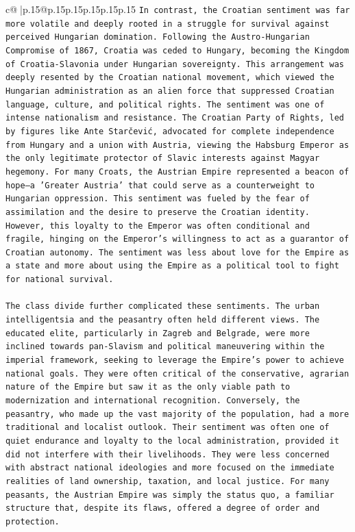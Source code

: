 \documentclass{article}
\begin{document}
{\begin{supertabular}{c@{$\;$}|p{.15\linewidth}@{}p{.15\linewidth}p{.15\linewidth}p{.15\linewidth}p{.15\linewidth}p{.15\linewidth}}
{{{\texttt{In contrast, the Croatian sentiment was far more volatile and deeply rooted in a struggle for survival against perceived Hungarian domination. Following the Austro{-}Hungarian Compromise of 1867, Croatia was ceded to Hungary, becoming the Kingdom of Croatia{-}Slavonia under Hungarian sovereignty. This arrangement was deeply resented by the Croatian national movement, which viewed the Hungarian administration as an alien force that suppressed Croatian language, culture, and political rights. The sentiment was one of intense nationalism and resistance. The Croatian Party of Rights, led by figures like Ante Starčević, advocated for complete independence from Hungary and a union with Austria, viewing the Habsburg Emperor as the only legitimate protector of Slavic interests against Magyar hegemony. For many Croats, the Austrian Empire represented a beacon of hope—a 'Greater Austria' that could serve as a counterweight to Hungarian oppression. This sentiment was fueled by the fear of assimilation and the desire to preserve the Croatian identity. However, this loyalty to the Emperor was often conditional and fragile, hinging on the Emperor's willingness to act as a guarantor of Croatian autonomy. The sentiment was less about love for the Empire as a state and more about using the Empire as a political tool to fight for national survival.} \\
\\ 
\texttt{The class divide further complicated these sentiments. The urban intelligentsia and the peasantry often held different views. The educated elite, particularly in Zagreb and Belgrade, were more inclined towards pan{-}Slavism and political maneuvering within the imperial framework, seeking to leverage the Empire's power to achieve national goals. They were often critical of the conservative, agrarian nature of the Empire but saw it as the only viable path to modernization and international recognition. Conversely, the peasantry, who made up the vast majority of the population, had a more traditional and localist outlook. Their sentiment was often one of quiet endurance and loyalty to the local administration, provided it did not interfere with their livelihoods. They were less concerned with abstract national ideologies and more focused on the immediate realities of land ownership, taxation, and local justice. For many peasants, the Austrian Empire was simply the status quo, a familiar structure that, despite its flaws, offered a degree of order and protection.} \\
\\ 
}}}
\end{supertabular}}
\end{document}
